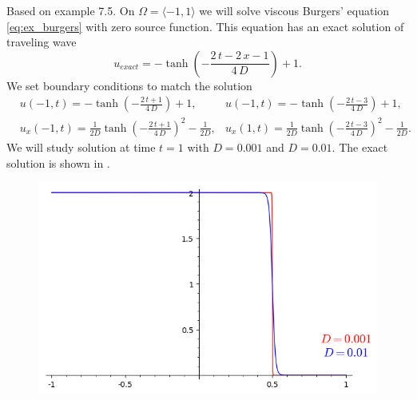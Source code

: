 \begin{example}
\label{ex:burgers_hest}
Based on \cite[Section 7.1.2, Example 7.5,  p. 255]{Hesthaven2008} example 7.5.
On $\Omega = \langle -1, 1 \rangle$ we will solve viscous Burgers’ equation 
\eqref{eq:ex_burgers} with zero source function.
This equation has an exact solution of traveling wave 
\begin{equation}
	u_{exact} =  -\tanh\left(-\frac{2 \, t - 2 \, x - 1}{4 \,D}\right) + 1.
\end{equation}
We set boundary conditions to match the solution
\begin{equation}
	\begin{aligned}
	& u(-1, t) = -\tanh\left(-\frac{2 \, t  + 1}{4 \,D}\right) + 1, 
	&  u(-1, t) = -\tanh\left(-\frac{2 \, t - 3}{4 \,D}\right) + 1,\\
	&u_x(-1, t) = \frac{1}{2D}\tanh\left(-\frac{2 \, t + 1}{4 \, D}\right)^{2} - 
	\frac{1}{2D}, 
	&u_x(1, t) = \frac{1}{2D}\tanh\left(-\frac{2 \, t - 3}{4 \, D}\right)^{2} - 
	\frac{1}{2D}.
	\end{aligned}
\end{equation}
We will study solution at time $t = 1$ with $D = 0.001$ and $D = 0.01$. The exact 
solution is shown in .
\begin{figure}[h]
	\centering
%	
	\includegraphics[scale=0.45]{../figs/burgers_hesthaven_exact_t1.png}

\end{figure}
\end{example}
